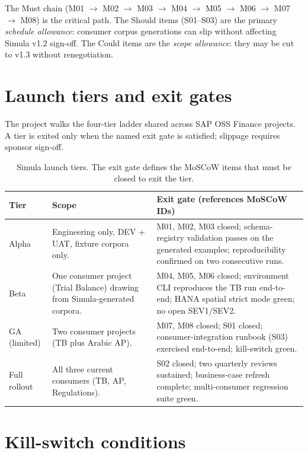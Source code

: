 \documentclass[12pt,a4paper,twoside]{report}
\begin{document}
\noindent
The Must chain (M01 $\to$ M02 $\to$ M03 $\to$ M04 $\to$ M05 $\to$ M06
$\to$ M07 $\to$ M08) is the critical path. The Should items
(S01--S03) are the primary \emph{schedule allowance}: consumer corpus
generations can slip without affecting Simula v1.2 sign-off. The Could
items are the \emph{scope allowance}: they may be cut to v1.3 without
renegotiation.

\section{Launch tiers and exit gates}\label{sec:sim-launch-tiers}

The project walks the four-tier ladder shared across SAP OSS Finance
projects. A tier is exited only when the named exit gate is satisfied;
slippage requires sponsor sign-off.

\begin{table}[htbp]
\centering
\caption{Simula launch tiers. The exit gate defines the MoSCoW items
that must be closed to exit the tier.}
\label{tab:sim-launch-tiers}
\footnotesize
\begin{tabularx}{\linewidth}{@{}l l X@{}}
\toprule
\textbf{Tier} & \textbf{Scope} & \textbf{Exit gate (references MoSCoW IDs)} \\ \midrule
Alpha & Engineering only, DEV + UAT, fixture corpora only. & M01, M02, M03 closed; schema-registry validation passes on the generated examples; reproducibility confirmed on two consecutive runs. \\
Beta  & One consumer project (Trial Balance) drawing from Simula-generated corpora. & M04, M05, M06 closed; environment CLI reproduces the TB run end-to-end; HANA spatial strict mode green; no open SEV1/SEV2. \\
GA (limited) & Two consumer projects (TB plus Arabic AP). & M07, M08 closed; S01 closed; consumer-integration runbook (S03) exercised end-to-end; kill-switch green. \\
Full rollout & All three current consumers (TB, AP, Regulations). & S02 closed; two quarterly reviews sustained; business-case refresh complete; multi-consumer regression suite green. \\
\bottomrule
\end{tabularx}
\end{table}

\section{Kill-switch conditions}\label{sec:sim-kill-switch}
\end{document}
